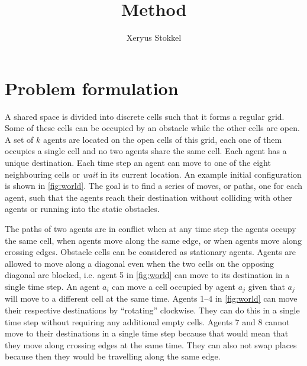 \documentclass[a4paper]{article}
\title{Method}
\author{Xeryus Stokkel}
\date{}
\begin{document}
\maketitle

\section{Problem formulation}

A shared space is divided into discrete cells such that it forms a regular
grid. Some of these cells can be occupied by an obstacle while the other cells
are open. A set of $k$ agents are located on the open cells of this grid, each
one of them occupies a single cell and no two agents share the same cell. Each
agent has a unique destination. Each time step an agent can move to one of the
eight neighbouring cells or \emph{wait} in its current location. An example
initial configuration is shown in \autoref{fig:world}. The goal is to find a
series of moves, or paths, one for each agent, such that the agents reach
their destination without colliding with other agents or running into the
static obstacles.

The paths of two agents are in conflict when at any time step the agents occupy
the same cell, when agents move along the same edge, or when agents move along
crossing edges. Obstacle cells can be considered as stationary agents. Agents
are allowed to move along a diagonal even when the two cells on the opposing
diagonal are blocked, i.e. agent 5 in \autoref{fig:world} can move to its
destination in a single time step. An agent $a_i$ can move a cell occupied by
agent $a_j$ given that $a_j$ will move to a different cell at the same time.
Agents 1--4 in \autoref{fig:world} can move their respective destinations
by ``rotating'' clockwise. They can do this in a single time step without
requiring any additional empty cells. Agents 7 and 8 cannot move to their
destinations in a single time step because that would mean that they move along
crossing edges at the same time. They can also not swap places because then
they would be travelling along the same edge.
\end{document}
